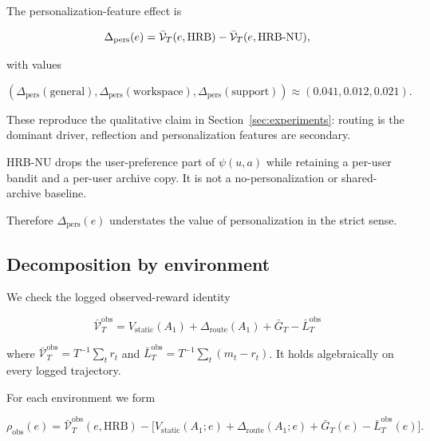 \documentclass{article} %
\begin{document}
The personalization-feature effect is

\begin{equation}
\label{eq:app-pers-effect}
\Delta_{\mathrm{pers}}(e) = \bar{\mathcal{V}}_T(e,\mathrm{HRB}) - \bar{\mathcal{V}}_T(e,\textnormal{HRB-NU}),
\end{equation}

with values

\begin{equation}
\label{eq:app-pers-numbers}
(\Delta_{\mathrm{pers}}(\mathrm{general}),\Delta_{\mathrm{pers}}(\mathrm{workspace}),\Delta_{\mathrm{pers}}(\mathrm{support}))
\approx (0.041, 0.012, 0.021).
\end{equation}

These reproduce the qualitative claim in Section~\ref{sec:experiments}: routing is the dominant driver, reflection and personalization features are secondary.

HRB-NU drops the user-preference part of $\psi(u,a)$ while retaining a per-user bandit and a per-user archive copy. It is not a no-personalization or shared-archive baseline.

Therefore $\Delta_{\mathrm{pers}}(e)$ understates the value of personalization in the strict sense.

\subsection{Decomposition by environment}

\label{app:decomp-reconcile}

We check the logged observed-reward identity

\begin{equation}
\label{eq:app-identity-recall}
\bar{\mathcal{V}}_T^{\mathrm{obs}}
= V_{\mathrm{static}}(A_1)
+ \Delta_{\mathrm{route}}(A_1)
+ \bar{G}_T
- \bar{L}_T^{\mathrm{obs}}
\end{equation}

where
\(\bar{\mathcal V}_T^{\mathrm{obs}}=T^{-1}\sum_t r_t\) and
\(\bar L_T^{\mathrm{obs}}=T^{-1}\sum_t(m_t-r_t)\). It holds algebraically on
every logged trajectory.

For each environment we form

\begin{equation}
\label{eq:app-residual}
\rho_{\mathrm{obs}}(e)
= \bar{\mathcal{V}}_T^{\mathrm{obs}}(e,\mathrm{HRB})
- \big[V_{\mathrm{static}}(A_1;e)
+ \Delta_{\mathrm{route}}(A_1;e)
+ \bar{G}_T(e)
- \bar{L}_T^{\mathrm{obs}}(e)\big].
\end{equation}
\end{document}
